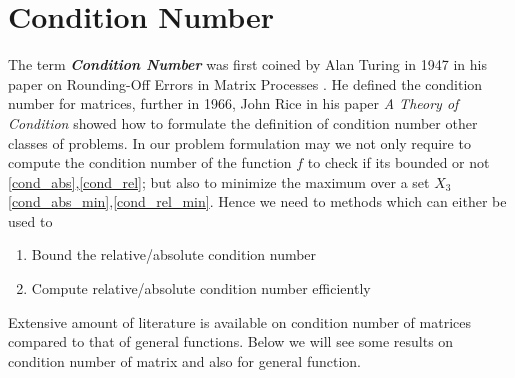 \section{Condition Number}
The term \textbf{\textit{Condition Number}} was first coined by Alan Turing in 1947 in his paper on Rounding-Off Errors in Matrix Processes \cite{turing1948rounding}. He defined the condition number for matrices, further in 1966, John Rice in his paper \textit{A Theory of Condition} \cite{rice1966theory} showed how to formulate the definition of condition number other classes of problems.
\newline\newline In our problem formulation may we not only require to compute the condition number of the function $f$ to check if its bounded or not \ref{cond_abs},\ref{cond_rel}; but also to minimize the maximum over a set $X_3$ \ref{cond_abs_min},\ref{cond_rel_min}.
\newline\newline Hence we need to methods which can either be used to 
\begin{enumerate}
    \item Bound the relative/absolute condition number
    \item Compute relative/absolute condition number efficiently
\end{enumerate}
Extensive amount of literature is available on condition number of matrices compared to that of general functions. Below we will see some results on condition number of matrix and also for general function.
